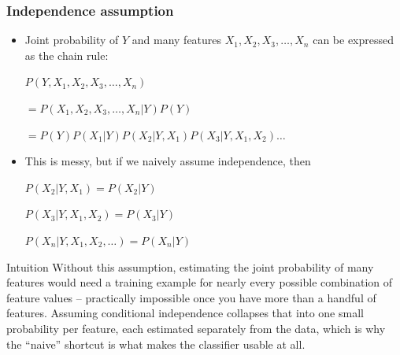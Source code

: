 \begin{frame}[fragile]\frametitle{Independence assumption }
\begin{itemize}
\item Joint probability of $Y$ and many features $X_1,X_2,X_3,\ldots,X_n$ can be expressed as the chain rule:

$P(Y,X_1,X_2,X_3,\ldots,X_n)$

$= P(X_1,X_2,X_3,\ldots,X_n|Y)P(Y)$

$= P(Y)P(X_1|Y)P(X_2|Y,X_1)P(X_3|Y,X_1,X_2)\ldots$

\item This is messy, but if we naively assume independence, then

$P(X_2|Y,X_1) = P(X_2|Y)$

$P(X_3|Y,X_1,X_2) = P(X_3|Y)$

$P(X_n|Y,X_1,X_2,\ldots) = P(X_n|Y)$

\end{itemize}

\begin{block}{Intuition}
Without this assumption, estimating the joint probability of many features would need a
training example for nearly every possible combination of feature values -- practically
impossible once you have more than a handful of features. Assuming conditional independence
collapses that into one small probability per feature, each estimated separately from the
data, which is why the ``naive'' shortcut is what makes the classifier usable at all.
\end{block}
\end{frame}






